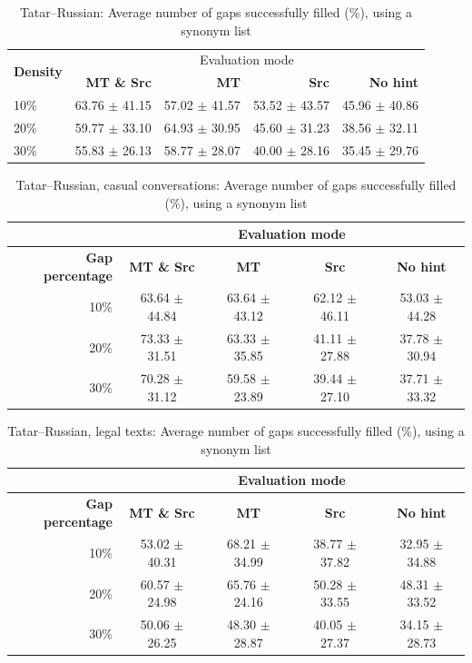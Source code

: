\documentclass[11pt]{article}
\begin{document}
\begin{table}
\centering
  \begin{tabular}{|l|r|r|r|r|}
    \hline
    \multirow{2}{*}{\textbf{Density}} & \multicolumn{4}{|c|}{Evaluation mode} \\\cline{2-5}
                                            & \textbf{MT \& Src} & \textbf{MT} & \textbf{Src} & \textbf{No hint} \\
\hline
10\%&63.76 \(\pm\) 41.15&57.02 \(\pm\) 41.57&53.52 \(\pm\) 43.57&45.96 \(\pm\) 40.86\\
20\%&59.77 \(\pm\) 33.10&64.93 \(\pm\) 30.95&45.60 \(\pm\) 31.23&38.56 \(\pm\) 32.11\\
30\%&55.83 \(\pm\) 26.13&58.77 \(\pm\) 28.07&40.00 \(\pm\) 28.16&35.45 \(\pm\) 29.76\\
    \hline
  \end{tabular}
  \caption{Tatar--Russian: Average number of gaps successfully filled (\%), using a synonym list}
  \label{table:res-tat-rus}
\end{table}


\begin{table}

\centering
\begin{tabular}{|r |*{4}{c}|}
\hline
  &\multicolumn{4}{c|}{\textbf{Evaluation mode}}\\
\hline
\textbf{Gap percentage} & \textbf{MT \& Src} & \textbf{MT} & \textbf{Src} & \textbf{No hint} \\
10\%&63.64 \(\pm\) 44.84&63.64 \(\pm\) 43.12&62.12 \(\pm\) 46.11&53.03 \(\pm\) 44.28\\
20\%&73.33 \(\pm\) 31.51&63.33 \(\pm\) 35.85&41.11 \(\pm\) 27.88&37.78 \(\pm\) 30.94\\
30\%&70.28 \(\pm\) 31.12&59.58 \(\pm\) 23.89&39.44 \(\pm\) 27.10&37.71 \(\pm\) 33.32\\
\hline
\end{tabular}
\caption {Tatar--Russian, casual conversations: Average number of gaps successfully filled (\%), using a synonym list} \label{table:rus-casual} 
\end{table}

\begin{table}
\centering
\begin{tabular}{|r |*{4}{c}|}
\hline
  &\multicolumn{4}{c|}{\textbf{Evaluation mode}}\\
\hline
\textbf{Gap percentage} & \textbf{MT \& Src} & \textbf{MT} & \textbf{Src} & \textbf{No hint} \\
10\%&53.02 \(\pm\) 40.31&68.21 \(\pm\) 34.99&38.77 \(\pm\) 37.82&32.95 \(\pm\) 34.88\\
20\%&60.57 \(\pm\) 24.98&65.76 \(\pm\) 24.16&50.28 \(\pm\) 33.55&48.31 \(\pm\) 33.52\\
30\%&50.06 \(\pm\) 26.25&48.30 \(\pm\) 28.87&40.05 \(\pm\) 27.37&34.15 \(\pm\) 28.73\\
\hline
\end{tabular}
\caption {Tatar--Russian, legal texts: Average number of gaps successfully filled (\%), using a synonym list} \label{table:rus-legal} 
\end{table}
\end{document}
